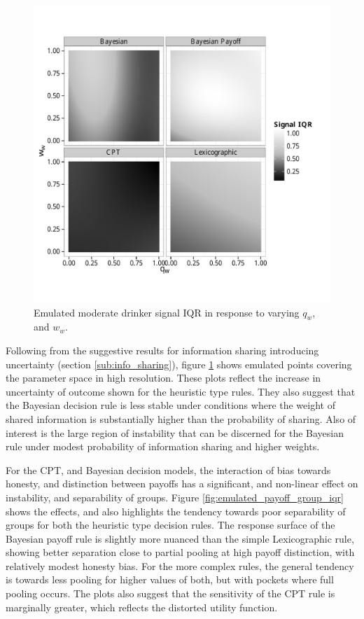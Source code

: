 \begin{figure}[h!]
\begin{adjustbox}{center}\includegraphics[width=0.8\paperwidth]{figures/unfixed_emu_sig_iqr}\end{adjustbox}
\caption{Emulated moderate drinker signal IQR in response to varying \(q_{w}\), and \(w_{w}\).}
\label{fig:emulated_sharing_iqr}
\end{figure}

Following from the suggestive results for information sharing introducing uncertainty (section \ref{sub:info_sharing}), figure \ref{fig:emulated_sharing_iqr} shows emulated points covering the parameter space in high resolution. These plots reflect the increase in uncertainty of outcome shown for the heuristic type rules. They also suggest that the Bayesian decision rule is less stable under conditions where the weight of shared information is substantially higher than the probability of sharing. Also of interest is the large region of instability that can be discerned for the Bayesian rule under modest probability of information sharing and higher weights.

For the \ac{CPT}, and Bayesian decision models, the interaction of bias towards honesty, and distinction between payoffs has a significant, and non-linear effect on instability, and separability of groups. Figure \ref{fig:emulated_payoff_group_iqr} shows the effects, and also highlights the tendency towards poor separability of groups for both the heuristic type decision rules. The response surface of the Bayesian payoff rule is slightly more nuanced than the simple Lexicographic rule, showing better separation close to partial pooling at high payoff distinction, with relatively modest honesty bias.  For the more complex rules, the general tendency is towards less pooling for higher values of both, but with pockets where full pooling occurs.  The plots also suggest that the sensitivity of the \ac{CPT} rule is marginally greater, which reflects the distorted utility function.


